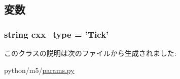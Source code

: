 \subsection{変数}
\hypertarget{classm5_1_1params_1_1TickParamValue_a2f1553ebb79374a68b36fdd6d8d82fc3}{
\subsubsection[{cxx\_\-type}]{\setlength{\rightskip}{0pt plus 5cm}string {\bf cxx\_\-type} = '{\bf Tick}'}}
\label{classm5_1_1params_1_1TickParamValue_a2f1553ebb79374a68b36fdd6d8d82fc3}


このクラスの説明は次のファイルから生成されました:\begin{DoxyCompactItemize}
\item 
python/m5/\hyperlink{params_8py}{params.py}\end{DoxyCompactItemize}
